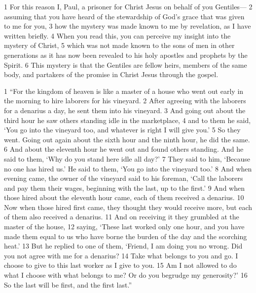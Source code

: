 \begin{bible}
1 For this reason I, Paul, a prisoner for Christ Jesus on behalf of you Gentiles— 2 assuming that you have heard of the stewardship of God's grace that was given to me for you, 3 how the mystery was made known to me by revelation, as I have written briefly. 4 When you read this, you can perceive my insight into the mystery of Christ, 5 which was not made known to the sons of men in other generations as it has now been revealed to his holy apostles and prophets by the Spirit. 6 This mystery is that the Gentiles are fellow heirs, members of the same body, and partakers of the promise in Christ Jesus through the gospel.



1 ``For the kingdom of heaven is like a master of a house who went out early in the morning to hire laborers for his vineyard. 2 After agreeing with the laborers for a denarius a day, he sent them into his vineyard. 3 And going out about the third hour he saw others standing idle in the marketplace, 4 and to them he said, ‘You go into the vineyard too, and whatever is right I will give you.’ 5 So they went. Going out again about the sixth hour and the ninth hour, he did the same. 6 And about the eleventh hour he went out and found others standing. And he said to them, ‘Why do you stand here idle all day?’ 7 They said to him, ‘Because no one has hired us.’ He said to them, ‘You go into the vineyard too.’ 8 And when evening came, the owner of the vineyard said to his foreman, ‘Call the laborers and pay them their wages, beginning with the last, up to the first.’ 9 And when those hired about the eleventh hour came, each of them received a denarius. 10 Now when those hired first came, they thought they would receive more, but each of them also received a denarius. 11 And on receiving it they grumbled at the master of the house, 12 saying, ‘These last worked only one hour, and you have made them equal to us who have borne the burden of the day and the scorching heat.’ 13 But he replied to one of them, ‘Friend, I am doing you no wrong. Did you not agree with me for a denarius? 14 Take what belongs to you and go. I choose to give to this last worker as I give to you. 15 Am I not allowed to do what I choose with what belongs to me? Or do you begrudge my generosity?’ 16 So the last will be first, and the first last.''


\end{bible}
